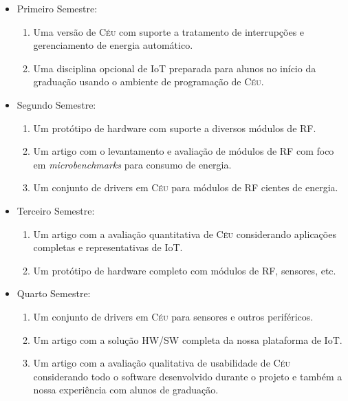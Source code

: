 \documentclass[titlepage,12pt]{article}
\newcommand{\CEU}{\textsc{C\'{e}u}\xspace}
\begin{document}
\begin{itemize}
\item Primeiro Semestre:
    \begin{enumerate}
    \item Uma versão de \CEU com suporte a tratamento de interrupções e
          gerenciamento de energia automático.
    \item Uma disciplina opcional de IoT preparada para alunos no início
          da graduação usando o ambiente de programação de \CEU.
    \end{enumerate}
\item Segundo Semestre:
    \begin{enumerate}
    \item Um protótipo de hardware com suporte a diversos módulos de RF.
    \item Um artigo com o levantamento e avaliação de módulos de RF com foco em
          \emph{microbenchmarks} para consumo de energia.
    \item Um conjunto de drivers em \CEU para módulos de RF cientes de energia.
    \end{enumerate}
\item Terceiro Semestre:
    \begin{enumerate}
    \item Um artigo com a avaliação quantitativa de \CEU considerando
          aplicações completas e representativas de IoT.
    \item Um protótipo de hardware completo com módulos de RF, sensores, etc.
    \end{enumerate}
\item Quarto Semestre:
    \begin{enumerate}
    \item Um conjunto de drivers em \CEU para sensores e outros periféricos.
    \item Um artigo com a solução HW/SW completa da nossa plataforma de IoT.
    \item Um artigo com a avaliação qualitativa de usabilidade de \CEU
          considerando todo o software desenvolvido durante o projeto e também
          a nossa experiência com alunos de graduação.
    \end{enumerate}
\end{itemize}

\end{document}
